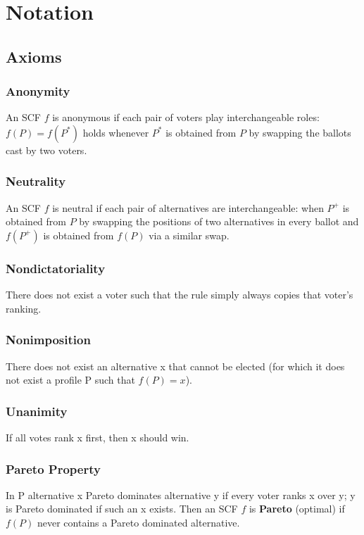 
\section{Notation}



\subsection{Axioms}

	\subsubsection{Anonymity}
	An SCF $f$ is anonymous if each pair of voters play interchangeable roles: $f(P)=f(P^{\ast})$ holds whenever $P^{\ast}$
	is obtained from $P$ by swapping the ballots cast by two voters.
	
	\subsubsection{Neutrality}
	An SCF $f$ is neutral if each pair of alternatives are
	interchangeable: when $P^+$ is obtained from $P$ by swapping the positions of two alternatives in every ballot and $f(P^+)$ is obtained from $f(P)$ via a similar swap.
	
	\subsubsection{Nondictatoriality}
	There does not exist a voter such that the rule simply always copies that voter’s ranking.
	
	\subsubsection{Nonimposition}
	There does not exist an alternative x that cannot be elected (for which it does not exist a profile P such that $f(P)={x}$).
	
	\subsubsection{Unanimity}
	If all votes rank x first, then x should win.
	
	\subsubsection{Pareto Property}
	In P alternative x Pareto dominates alternative y if every voter ranks x over y; y is Pareto dominated if such an x exists. Then an SCF $f$ is \textbf{Pareto} (optimal) if $f(P)$ never contains a Pareto dominated alternative.
	
